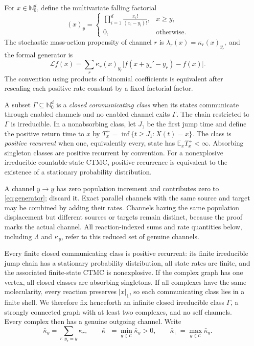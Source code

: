 For \(x\in\mathbb N_0^d\), define the multivariate falling factorial
\begin{equation}\label{eq:falling}
  (x)_y=
  \begin{cases}
  \displaystyle\prod_{i=1}^d\frac{x_i!}{(x_i-y_i)!},&x\ge y,\\[1ex]
  0,&\text{otherwise}.
  \end{cases}
\end{equation}
The stochastic mass-action propensity of channel \(r\) is
\(\lambda_r(x)=\kappa_r(x)_{y_r}\), and the formal generator is
\begin{equation}\label{eq:generator}
  \mathcal Lf(x)=\sum_r\kappa_r(x)_{y_r}
  \bigl[f(x+y_r'-y_r)-f(x)\bigr].
\end{equation}
The convention using products of binomial coefficients is equivalent after
rescaling each positive rate constant by a fixed factorial factor.

A subset \(\Gamma\subseteq\mathbb N_0^d\) is a \emph{closed communicating
class} when its states communicate through enabled channels and no enabled
channel exits \(\Gamma\).  The chain restricted to \(\Gamma\) is
irreducible.  In a nonabsorbing class, let \(J_1\) be the first jump time and
define the positive return time to \(x\) by
\(T_x^+=\inf\{t\ge J_1:X(t)=x\}\).  The class is \emph{positive recurrent}
when one, equivalently every, state has \(\mathbb E_xT_x^+<\infty\).
Absorbing singleton classes are positive recurrent by convention.  For a
nonexplosive irreducible countable-state CTMC, positive recurrence is
equivalent to the existence of a stationary probability distribution.

A channel \(y\to y\) has zero population increment and contributes zero to
\eqref{eq:generator}; discard it.  Exact parallel channels with the same
source and target may be combined by adding their rates.  Channels having the
same population displacement but different sources or targets remain
distinct, because the proof marks the actual channel.
All reaction-indexed sums and rate quantities below, including \(\Lambda\)
and \(\bar\kappa_y\), refer to this reduced set of genuine channels.

Every finite closed communicating class is positive recurrent: its finite
irreducible jump chain has a stationary probability distribution, all state
rates are finite, and the associated finite-state CTMC is nonexplosive.  If
the complex graph has one vertex, all closed classes are absorbing
singletons.  If all complexes have the same molecularity, every reaction
preserves \(|x|_1\), so each communicating class lies in a finite shell.  We
therefore fix henceforth an infinite closed irreducible class \(\Gamma\), a
strongly connected graph with at least two complexes, and no self channels.
Every complex then has a genuine outgoing channel.  Write
\begin{equation}\label{eq:kbar}
  \bar\kappa_y=\sum_{r:y_r=y}\kappa_r,
  \qquad
  \bar\kappa_- =\min_{y\in\mathcal C}\bar\kappa_y>0,
  \qquad
  \bar\kappa_+ =\max_{y\in\mathcal C}\bar\kappa_y.
\end{equation}

